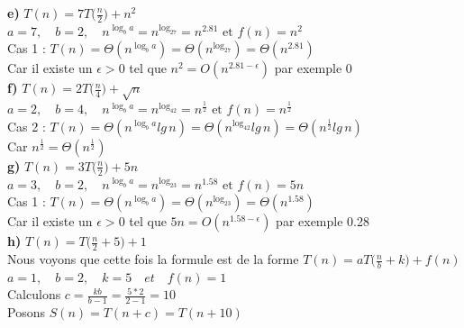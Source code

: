 \documentclass[12pt]{article}
\begin{document}
\textbf{e) } \(T(n)=7T\big(\frac{n}{2}\big)+n^2\) \\

\(a=7, \quad b=2, \quad n^{\log_ba} = n^{\log_27}=n^{2.81} \text{ et } f(n) = n^2\) \\

Cas 1 : \(T(n) = \Theta(n^{\log_ba}) = \Theta(n^{\log_27}) = \Theta(n^{2.81}) \) \\

Car il existe un \(\epsilon>0\) tel que \(n^2 = O(n^{2.81-\epsilon}) \) par exemple 0 \\

\textbf{f) } \(T(n)=2T\big(\frac{n}{4}\big)+\sqrt{n}\) \\

\(a=2, \quad b=4, \quad n^{\log_ba} = n^{\log_42}=n^{\frac{1}{2}} \text{ et } f(n) = n^{\frac{1}{2}}\) \\

Cas 2 : \(T(n) = \Theta(n^{\log_ba}lg \, n) = \Theta(n^{\log_42}lg \, n) = \Theta(n^{\frac{1}{2}}lg \, n) \) \\

Car \(n^{\frac{1}{2}} = \Theta(n^{\frac{1}{2}}) \) \\

\textbf{g) } \(T(n)=3T\big(\frac{n}{2}\big)+5n\) \\

\(a=3, \quad b=2, \quad n^{\log_ba} = n^{\log_23}=n^{1.58} \text{ et } f(n) = 5n\) \\

Cas 1 : \(T(n) = \Theta(n^{\log_ba}) = \Theta(n^{\log_23}) = \Theta(n^{1.58}) \) \\

Car il existe un \(\epsilon>0\) tel que \(5n = O(n^{1.58-\epsilon}) \) par exemple 0.28 \\

\textbf{h) } \(T(n)=T\big(\frac{n}{2}+5\big)+1\) \\

Nous voyons que cette fois la formule est de la forme \(T(n) = aT \big(\frac{n}{b}+k \big) + f(n) \) \\

\(a=1, \quad b=2, \quad k=5 \quad et \quad f(n) = 1\) \\

Calculons \(c = \frac{kb}{b-1} = \frac{5*2}{2-1} = 10\) \\

Posons \(S(n) = T(n+c) = T(n+10) \) \\
\end{document}
